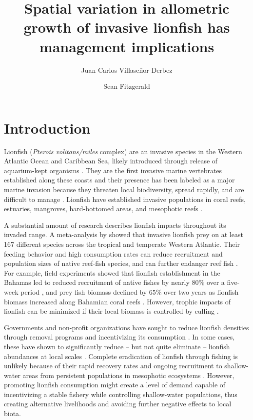 \documentclass[fleqn,10pt,lineno]{wlpeerj} %
\title{Spatial variation in allometric growth of invasive lionfish has
management implications}
\author[1]{Juan Carlos Villaseñor-Derbez}
\author[1]{Sean Fitzgerald}
\affil[1]{Bren School of Environmental Sciences and Management, University of California
  Santa Barbara, Santa Barbara, California, USA}
\begin{document}
\flushbottom
\maketitle
\thispagestyle{empty}

\section*{Introduction}

Lionfish (\emph{Pterois volitans/miles} complex) are an invasive species
in the Western Atlantic Ocean and Caribbean Sea, likely introduced
through release of aquarium-kept organisms \citep{betancurr_2011}. They
are the first invasive marine vertebrates established along these coasts
\citep{schofield_2009,schofield_2010,sabidoitza_2016} and their presence
has been labeled as a major marine invasion because they threaten local
biodiversity, spread rapidly, and are difficult to manage
\citep{hixon_2016}. Lionfish have established invasive populations in
coral reefs, estuaries, mangroves, hard-bottomed areas, and mesophotic
reefs
\citep{barbour_2010,jud_2011,muoz_2011,claydon_2012,andradibrown_2017,gress_2017}.

A substantial amount of research describes lionfish impacts throughout
its invaded range. A meta-analysis by \citet{peake_2018} showed that
invasive lionfish prey on at least 167 different species across the
tropical and temperate Western Atlantic. Their feeding behavior and high
consumption rates can reduce recruitment and population sizes of native
reef-fish species, and can further endanger reef fish
\citep[][but see \citealt{hackerott_2017} for a counterexample]{green_2012,rocha_2015}.
For example, field experiments showed that lionfish establishment in the
Bahamas led to reduced recruitment of native fishes by nearly 80\% over
a five-week period \citep{albins_2008}, and prey fish biomass declined
by 65\% over two years as lionfish biomass increased along Bahamian
coral reefs \citep{green_2012}. However, trophic impacts of lionfish can
be minimized if their local biomass is controlled by culling
\citep{ariasgonzalez_2011}.

Governments and non-profit organizations have sought to reduce lionfish
densities through removal programs and incentivizing its consumption
\citep{chin_2016}. In some cases, these have shown to significantly
reduce -- but not quite eliminate -- lionfish abundances at local scales
\citep{deleon_2013,sandel_2015}. Complete eradication of lionfish
through fishing is unlikely because of their rapid recovery rates and
ongoing recruitment to shallow-water areas from persistent populations
in mesophotic ecosystems \citep{barbour_2011,andradibrown_2017}.
However, promoting lionfish consumption might create a level of demand
capable of incentivizing a stable fishery while controlling
shallow-water populations, thus creating alternative livelihoods and
avoiding further negative effects to local biota.
\end{document}
